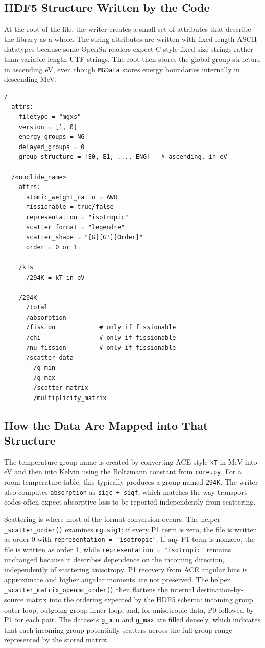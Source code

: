 \documentclass[11pt]{article}
\begin{document}
\subsection*{HDF5 Structure Written by the Code}
At the root of the file, the writer creates a small set of attributes that describe the library as a whole. The string attributes are written with fixed-length ASCII datatypes because some OpenSn readers expect C-style fixed-size strings rather than variable-length UTF strings. The root then stores the global group structure in ascending eV, even though \texttt{MGData} stores energy boundaries internally in descending MeV.

\begin{lstlisting}
/
  attrs:
    filetype = "mgxs"
    version = [1, 0]
    energy_groups = NG
    delayed_groups = 0
    group structure = [E0, E1, ..., ENG]   # ascending, in eV

  /<nuclide_name>
    attrs:
      atomic_weight_ratio = AWR
      fissionable = true/false
      representation = "isotropic"
      scatter_format = "legendre"
      scatter_shape = "[G][G'][Order]"
      order = 0 or 1

    /kTs
      /294K = kT in eV

    /294K
      /total
      /absorption
      /fission            # only if fissionable
      /chi                # only if fissionable
      /nu-fission         # only if fissionable
      /scatter_data
        /g_min
        /g_max
        /scatter_matrix
        /multiplicity_matrix
\end{lstlisting}

\subsection*{How the Data Are Mapped into That Structure}
The temperature group name is created by converting ACE-style \texttt{kT} in MeV into eV and then into Kelvin using the Boltzmann constant from \texttt{core.py}. For a room-temperature table, this typically produces a group named \texttt{294K}. The writer also computes \texttt{absorption} as \texttt{sigc + sigf}, which matches the way transport codes often expect absorptive loss to be reported independently from scattering.

Scattering is where most of the format conversion occurs. The helper \texttt{\_scatter\_order()} examines \texttt{mg.sig1}; if every P1 term is zero, the file is written as order 0 with \texttt{representation = "isotropic"}. If any P1 term is nonzero, the file is written as order 1, while \texttt{representation = "isotropic"} remains unchanged because it describes dependence on the incoming direction, independently of scattering anisotropy. P1 recovery from ACE angular bins is approximate and higher angular moments are not preserved. The helper \texttt{\_scatter\_matrix\_openmc\_order()} then flattens the internal destination-by-source matrix into the ordering expected by the HDF5 schema: incoming group outer loop, outgoing group inner loop, and, for anisotropic data, P0 followed by P1 for each pair. The datasets \texttt{g\_min} and \texttt{g\_max} are filled densely, which indicates that each incoming group potentially scatters across the full group range represented by the stored matrix.
\end{document}
